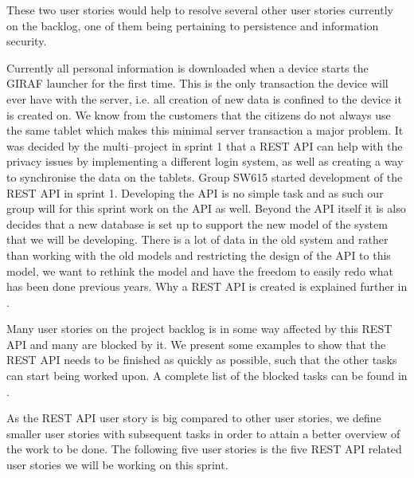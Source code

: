 These two user stories would help to resolve several other user stories currently on the backlog, one of them being pertaining to persistence and information security.     
\begin{center}
\end{center}

Currently all personal information is downloaded when a device starts the GIRAF launcher for the first time.
This is the only transaction the device will ever have with the server, i.e. all creation of new data is confined to the device it is created on.
We know from the customers that the citizens do not always use the same tablet which makes this minimal server transaction a major problem.
It was decided by the multi--project in sprint 1 that a REST API can help with the privacy issues by implementing a different login system, as well as creating a way to synchronise the data on the tablets.
Group SW615 started development of the REST API in sprint 1.
Developing the API is no simple task and as such our group will for this sprint work on the API as well.
Beyond the API itself it is also decides that a new database is set up to support the new model of the system that we will be developing.
There is a lot of data in the old system and rather than working with the old models and restricting the design of the API to this model, we want to rethink the model and have the freedom to easily redo what has been done previous years.
Why a REST API is created is explained further in .

Many user stories on the project backlog is in some way affected by this REST API and many are blocked by it.
We present some examples to show that the REST API needs to be finished as quickly as possible, such that the other tasks can start being worked upon.
A complete list of the blocked tasks can be found in . 

As the REST API user story is big compared to other user stories, we define smaller user stories with subsequent tasks in order to attain a better overview of the work to be done.
The following five user stories is the five REST API related user stories we will be working on this sprint.

